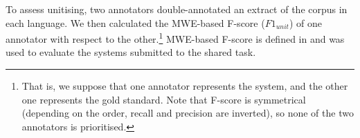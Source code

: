 \documentclass[output=paper,
modfonts,
]{langscibook}
\begin{document}
To assess unitising, two annotators double-annotated an extract of the corpus in each language. We then calculated the MWE-based F-score ($F1_{unit}$) of one annotator with respect to the other.\footnote{That is, we suppose that one annotator represents the system, and the other one represents the gold standard. Note that F-score is symmetrical (depending on the order, recall and precision are inverted), so none of the two annotators is prioritised.} MWE-based F-score is defined in \citet{MWEWorkshop} and was used to evaluate the systems submitted to the shared task.  %
\end{document}
